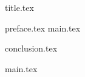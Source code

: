 



{title.tex}

\clearpage
\setcounter{page}{2}

\tableofcontents
\thispagestyle{empty}

\clearpage
\pagestyle{fancy}

\clearpage

{preface.tex}
{main.tex}

{conclusion.tex}

\clearpage
{}
{}
\renewcommand\bibname{Перелік посилань}


{main.tex}


